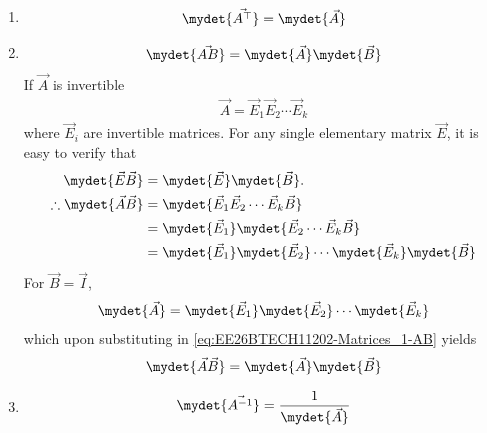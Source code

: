 \begin{enumerate}[label=\thesubsection.\arabic*, ref=\thesubsection.\theenumi]
\begin{align}
{2 & 8 & 4 \\
3 & 12 & 6
}
\end{align}
Following row reduction, 
\begin{align}
\vec{A} \xrightarrow{R_2 \to R_2 - 2R_1} \myvec{
1 & 4 & 2 \\
0 & 0 & 0 \\
3 & 12 & 6
}
\xrightarrow{R_3 \to R_3 - 3R_1} \myvec{
1 & 4 & 2 \\
0 & 0 & 0 \\
0 & 0 & 0
}
\end{align}
yielding
			\eqref{eq:EE26BTECH11202-rank-one}.
	\item 
	\begin{align}
	\mydet{\vec{A^{\top}}} = \mydet{\vec{A}} \label{eq:EE26BTECH11202-Matrices_1} 
	\end{align}
\item 
	\begin{align}
	\mydet{\vec{AB}} = \mydet{\vec{A}}\mydet{\vec{B}} 
	\end{align}
\solution
If $\vec{A}$ is invertible 
\begin{align}
\vec{A} = \vec{E}_1 \vec{E}_2 \cdots \vec{E}_k
\end{align}
where $\vec{E}_i$ are invertible matrices.
For any single elementary matrix $\vec{E}$, it is easy to verify that  
\begin{align}
	\mydet{\vec{E}\vec{B}} &= \mydet{\vec{E}}\mydet{\vec{B}}.
\\
\therefore
\mydet{\vec{A}\vec{B}} &= \mydet{\vec{E}_1 \vec{E}_2 \cdots \vec{E}_k \vec{B}} \\
&= \mydet{\vec{E}_1} \mydet{\vec{E}_2 \cdots \vec{E}_k \vec{B}} \\
&= \mydet{\vec{E}_1} \mydet{\vec{E}_2} \cdots \mydet{\vec{E}_k} \mydet{\vec{B}}
\label{eq:EE26BTECH11202-Matrices_1-AB} 
\end{align}
For $\vec{B}=\vec{I}$, 
\begin{align}
\mydet{\vec{A}} = \mydet{\vec{E}_1} \mydet{\vec{E}_2} \cdots \mydet{\vec{E}_k}
\end{align}
which upon substituting in 
\eqref{eq:EE26BTECH11202-Matrices_1-AB} 
yields
\begin{align}
	\mydet{\vec{A}\vec{B}} = \mydet{\vec{A}}\mydet{\vec{B}} \label{eq:EE26BTECH11202-product_determinant}
\end{align}
\item 
\begin{align}
\mydet{\vec{A^{-1}}} = \frac{1}{\mydet{\vec{A}}} \label{eq:EE26BTECH11202-Matrices_inverse}

\end{align}
\end{enumerate}
